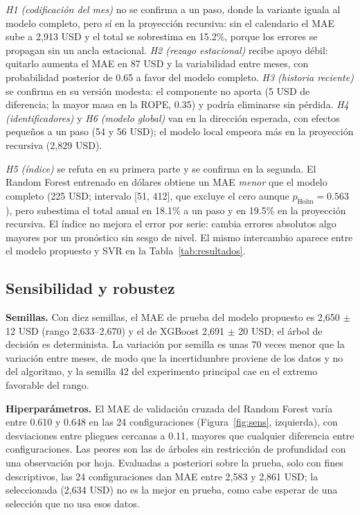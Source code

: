 \documentclass[pdflatex,sn-mathphys-num]{sn-jnl}
\begin{document}
\emph{H1 (codificación del mes)} no se confirma a un paso, donde la variante iguala al modelo completo, pero sí en la proyección recursiva: sin el calendario el MAE sube a 2{,}913 USD y el total se sobrestima en 15.2\%, porque los errores se propagan sin un ancla estacional. \emph{H2 (rezago estacional)} recibe apoyo débil: quitarlo aumenta el MAE en 87 USD y la variabilidad entre meses, con probabilidad posterior de 0.65 a favor del modelo completo. \emph{H3 (historia reciente)} se confirma en su versión modesta: el componente no aporta (5 USD de diferencia; la mayor masa en la ROPE, 0.35) y podría eliminarse sin pérdida. \emph{H4 (identificadores)} y \emph{H6 (modelo global)} van en la dirección esperada, con efectos pequeños a un paso (54 y 56 USD); el modelo local empeora más en la proyección recursiva (2{,}829 USD).

\emph{H5 (índice)} se refuta en su primera parte y se confirma en la segunda. El Random Forest entrenado en dólares obtiene un MAE \emph{menor} que el modelo completo (225 USD; intervalo [51, 412], que excluye el cero aunque $p_{\mathrm{Holm}}=0.563$), pero subestima el total anual en 18.1\% a un paso y en 19.5\% en la proyección recursiva. El índice no mejora el error por serie: cambia errores absolutos algo mayores por un pronóstico sin sesgo de nivel. El mismo intercambio aparece entre el modelo propuesto y SVR en la Tabla~\ref{tab:resultados}.

\subsection{Sensibilidad y robustez}\label{subsec:sensibilidad}

\textbf{Semillas.} Con diez semillas, el MAE de prueba del modelo propuesto es 2{,}650 $\pm$ 12 USD (rango 2{,}633--2{,}670) y el de XGBoost 2{,}691 $\pm$ 20 USD; el árbol de decisión es determinista. La variación por semilla es unas 70 veces menor que la variación entre meses, de modo que la incertidumbre proviene de los datos y no del algoritmo, y la semilla 42 del experimento principal cae en el extremo favorable del rango.

\textbf{Hiperparámetros.} El MAE de validación cruzada del Random Forest varía entre 0.610 y 0.648 en las 24 configuraciones (Figura~\ref{fig:sens}, izquierda), con desviaciones entre pliegues cercanas a 0.11, mayores que cualquier diferencia entre configuraciones. Las peores son las de árboles sin restricción de profundidad con una observación por hoja. Evaluadas a posteriori sobre la prueba, solo con fines descriptivos, las 24 configuraciones dan MAE entre 2{,}583 y 2{,}861 USD; la seleccionada (2{,}634 USD) no es la mejor en prueba, como cabe esperar de una selección que no usa esos datos.
\end{document}
